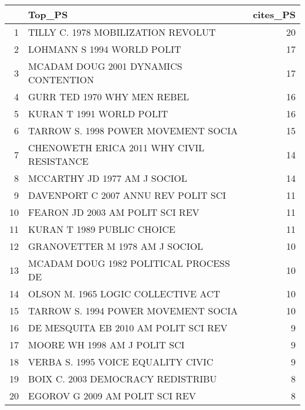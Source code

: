 \begin{table}[ht]
\centering
\begin{tabular}{rlr}
  \hline
 & Top\_PS & cites\_PS \\ 
  \hline
1 & TILLY C. 1978 MOBILIZATION REVOLUT & 20 \\ 
  2 & LOHMANN S 1994 WORLD POLIT  & 17 \\ 
  3 & MCADAM DOUG 2001 DYNAMICS CONTENTION & 17 \\ 
  4 & GURR TED 1970 WHY MEN REBEL & 16 \\ 
  5 & KURAN T 1991 WORLD POLIT  & 16 \\ 
  6 & TARROW S. 1998 POWER MOVEMENT SOCIA & 15 \\ 
  7 & CHENOWETH ERICA 2011 WHY CIVIL RESISTANCE & 14 \\ 
  8 & MCCARTHY JD 1977 AM J SOCIOL  & 14 \\ 
  9 & DAVENPORT C 2007 ANNU REV POLIT SCI  & 11 \\ 
  10 & FEARON JD 2003 AM POLIT SCI REV  & 11 \\ 
  11 & KURAN T 1989 PUBLIC CHOICE  & 11 \\ 
  12 & GRANOVETTER M 1978 AM J SOCIOL  & 10 \\ 
  13 & MCADAM DOUG 1982 POLITICAL PROCESS DE & 10 \\ 
  14 & OLSON M. 1965 LOGIC COLLECTIVE ACT & 10 \\ 
  15 & TARROW S. 1994 POWER MOVEMENT SOCIA & 10 \\ 
  16 & DE MESQUITA EB 2010 AM POLIT SCI REV  & 9 \\ 
  17 & MOORE WH 1998 AM J POLIT SCI  & 9 \\ 
  18 & VERBA S. 1995 VOICE EQUALITY CIVIC & 9 \\ 
  19 & BOIX C. 2003 DEMOCRACY REDISTRIBU & 8 \\ 
  20 & EGOROV G 2009 AM POLIT SCI REV  & 8 \\ 
   \hline
\end{tabular}
\end{table}
